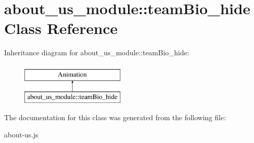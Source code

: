 \hypertarget{classabout__us__module_1_1teamBio__hide}{\section{about\-\_\-us\-\_\-module\-:\-:team\-Bio\-\_\-hide Class Reference}
\label{classabout__us__module_1_1teamBio__hide}
}
Inheritance diagram for about\-\_\-us\-\_\-module\-:\-:team\-Bio\-\_\-hide\-:\begin{figure}[H]
\begin{center}
\leavevmode
\includegraphics[height=2.000000cm]{classabout__us__module_1_1teamBio__hide}
\end{center}
\end{figure}


The documentation for this class was generated from the following file\-:\begin{DoxyCompactItemize}
\item 
about-\/us.\-js\end{DoxyCompactItemize}
